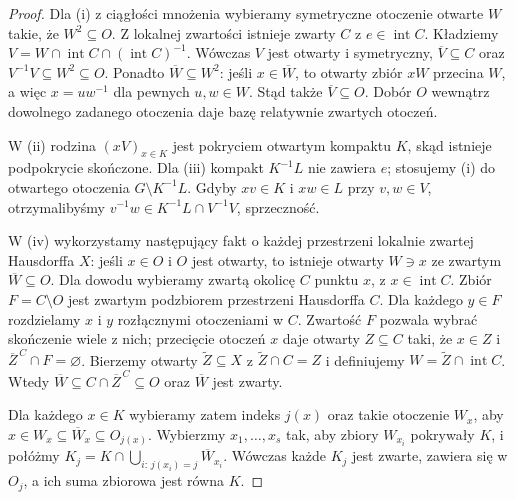 \documentclass[11pt,a4paper,oneside]{book}
\numberwithin{equation}{chapter}
\theoremstyle{plain}
\theoremstyle{definition}
\theoremstyle{remark}
\begin{document}
\begin{proof}
Dla (i) z ciągłości mnożenia wybieramy symetryczne
otoczenie otwarte $W$ takie, że $W^2\subseteq O$.
Z lokalnej zwartości istnieje zwarty $C$ z
$e\in\operatorname{int}C$. Kładziemy
$V=W\cap\operatorname{int}C\cap(\operatorname{int}C)^{-1}$.
Wówczas $V$ jest otwarty i symetryczny,
$\overline V\subseteq C$ oraz
$V^{-1}V\subseteq W^2\subseteq O$.
Ponadto $\overline W\subseteq W^2$: jeśli $x\in\overline W$,
to otwarty zbiór $xW$ przecina $W$, a więc
$x=uw^{-1}$ dla pewnych $u,w\in W$.
Stąd także $\overline V\subseteq O$.
Dobór $O$ wewnątrz dowolnego zadanego otoczenia
daje bazę relatywnie zwartych otoczeń.

W (ii) rodzina $(xV)_{x\in K}$ jest pokryciem otwartym
kompaktu $K$, skąd istnieje podpokrycie skończone.
Dla (iii) kompakt $K^{-1}L$ nie zawiera $e$;
stosujemy (i) do otwartego otoczenia
$G\setminus K^{-1}L$. Gdyby $xv\in K$ i $xw\in L$
przy $v,w\in V$, otrzymalibyśmy
$v^{-1}w\in K^{-1}L\cap V^{-1}V$, sprzeczność.

W (iv) wykorzystamy następujący fakt o każdej przestrzeni
lokalnie zwartej Hausdorffa $X$: jeśli $x\in O$ i $O$
jest otwarty, to istnieje otwarty $W\ni x$ ze
zwartym $\overline W\subseteq O$. Dla dowodu wybieramy
zwartą okolicę $C$ punktu $x$, z $x\in\operatorname{int}C$.
Zbiór $F=C\setminus O$ jest zwartym podzbiorem
przestrzeni Hausdorffa $C$. Dla każdego $y\in F$
rozdzielamy $x$ i $y$ rozłącznymi otoczeniami w $C$.
Zwartość $F$ pozwala wybrać skończenie wiele z nich;
przecięcie otoczeń $x$ daje otwarty $Z\subseteq C$
taki, że $x\in Z$ i $\overline Z^{\,C}\cap F=\varnothing$.
Bierzemy otwarty $\widetilde Z\subseteq X$ z
$\widetilde Z\cap C=Z$ i definiujemy
$W=\widetilde Z\cap\operatorname{int}C$.
Wtedy $\overline W\subseteq C\cap\overline Z^{\,C}
\subseteq O$ oraz $\overline W$ jest zwarty.

Dla każdego $x\in K$ wybieramy zatem indeks $j(x)$
oraz takie otoczenie $W_x$, aby
$x\in W_x\subseteq\overline W_x\subseteq O_{j(x)}$.
Wybierzmy $x_1,\dots,x_s$ tak, aby zbiory $W_{x_i}$
pokrywały $K$, i połóżmy
$K_j=K\cap\bigcup_{i:\,j(x_i)=j}\overline W_{x_i}$.
Wówczas każde $K_j$ jest zwarte, zawiera się w $O_j$,
a ich suma zbiorowa jest równa $K$.
\end{proof}
\end{document}
